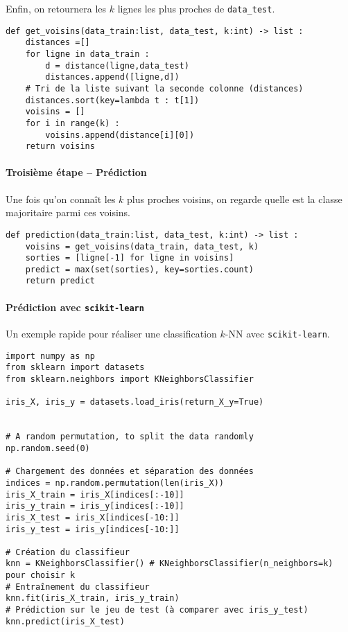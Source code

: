 {Enfin, on retournera les $k$ lignes les plus proches de \texttt{data\_test}.


\begin{lstlisting}
def get_voisins(data_train:list, data_test, k:int) -> list :
    distances =[]
    for ligne in data_train : 
        d = distance(ligne,data_test)
        distances.append([ligne,d])
    # Tri de la liste suivant la seconde colonne (distances)
    distances.sort(key=lambda t : t[1]) 
    voisins = []
    for i in range(k) :
        voisins.append(distance[i][0])
    return voisins
\end{lstlisting}

\paragraph*{Troisième étape -- Prédiction}

Une fois qu'on connaît les $k$ plus proches voisins, on regarde quelle est la classe majoritaire parmi ces voisins. 

\begin{lstlisting}
def prediction(data_train:list, data_test, k:int) -> list :
    voisins = get_voisins(data_train, data_test, k)
    sorties = [ligne[-1] for ligne in voisins]
    predict = max(set(sorties), key=sorties.count)
    return predict
\end{lstlisting}


\paragraph*{Prédiction avec \texttt{scikit-learn}}

Un exemple rapide pour réaliser une classification $k$-NN avec \texttt{scikit-learn}.
\begin{lstlisting}
import numpy as np
from sklearn import datasets
from sklearn.neighbors import KNeighborsClassifier

iris_X, iris_y = datasets.load_iris(return_X_y=True)


# A random permutation, to split the data randomly
np.random.seed(0)

# Chargement des données et séparation des données
indices = np.random.permutation(len(iris_X))
iris_X_train = iris_X[indices[:-10]]
iris_y_train = iris_y[indices[:-10]]
iris_X_test = iris_X[indices[-10:]]
iris_y_test = iris_y[indices[-10:]]

# Création du classifieur
knn = KNeighborsClassifier() # KNeighborsClassifier(n_neighbors=k) pour choisir k
# Entraînement du classifieur
knn.fit(iris_X_train, iris_y_train)
# Prédiction sur le jeu de test (à comparer avec iris_y_test)
knn.predict(iris_X_test)
\end{lstlisting}



}

